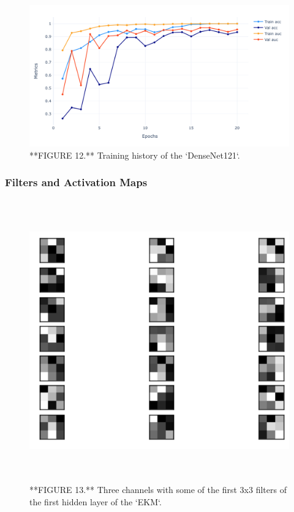 \documentclass{acm_proc_article-sp}
\begin{document}
\begin{figure}

{\centering \includegraphics[width=19.56in]{Images/TrainingHistoryDenseNet121} 

}

\caption{**FIGURE 12.** Training history of the `DenseNet121`.}\label{fig:densenet-training}
\end{figure}

\hypertarget{filters-featuremaps}{%
\subsubsection{Filters and Activation Maps}\label{filters-featuremaps}}

\begin{figure}

{\centering \includegraphics[width=550px,height=460]{Images/FiltersEKM} 

}

\caption{**FIGURE 13.** Three channels with some of the first 3x3 filters of the first hidden layer of the `EKM`.}\label{fig:filters-ekm}
\end{figure}
\end{document}
